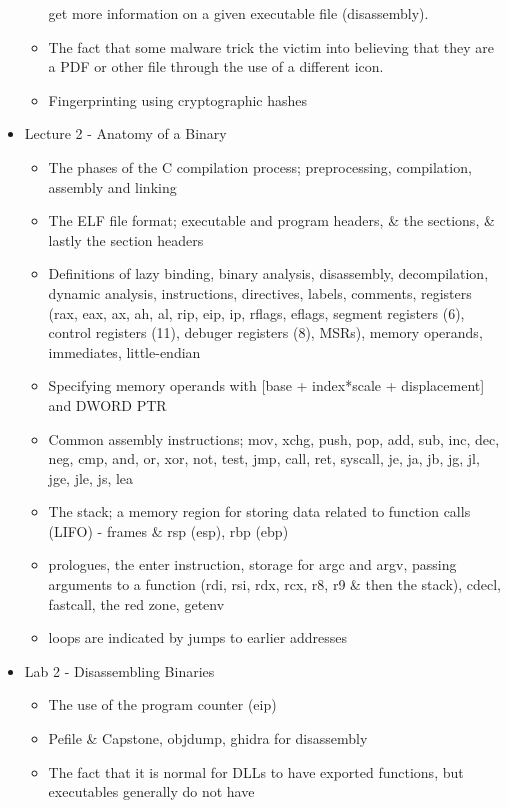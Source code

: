 \documentclass[]{project_plan}
\begin{document}
\begin{itemize}
\begin{itemize}
                get more information on a given executable file (disassembly).
          \item The fact that some malware trick the victim into believing that they
                are a PDF or other file through the use of a different icon.
          \item Fingerprinting using cryptographic hashes
        \end{itemize}
  \item Lecture 2 - Anatomy of a Binary
        \begin{itemize}
          \item The phases of the C compilation process; preprocessing, compilation, assembly and linking
          \item The ELF file format; executable and program headers, \& the sections, \& lastly the section headers
          \item Definitions of lazy binding, binary analysis, disassembly, decompilation, dynamic analysis, instructions,
                directives, labels, comments, registers (rax, eax, ax, ah, al, rip, eip, ip, rflags, eflags, segment
                registers (6), control registers (11), debuger registers (8), MSRs), memory operands, immediates, little-endian
          \item Specifying memory operands with [base + index*scale + displacement] and DWORD PTR
          \item Common assembly instructions; mov, xchg, push, pop, add, sub, inc, dec, neg, cmp, and, or, xor, not, test, jmp, call, ret, syscall, je, ja, jb, jg, jl, jge, jle, js, lea
          \item The stack; a memory region for storing data related to function calls (LIFO) - frames \& rsp (esp), rbp (ebp)
          \item prologues, the enter instruction, storage for argc and argv, passing arguments to a function (rdi, rsi, rdx, rcx, r8, r9 \& then the stack), cdecl, fastcall, the red zone, getenv
          \item loops are indicated by jumps to earlier addresses
        \end{itemize}
  \item Lab 2 - Disassembling Binaries
        \begin{itemize}
          \item The use of the program counter (eip)
          \item Pefile \& Capstone, objdump, ghidra for disassembly
          \item The fact that it is normal for DLLs to have exported functions, but executables generally do not have

\end{itemize}
\end{itemize}
\end{document}
